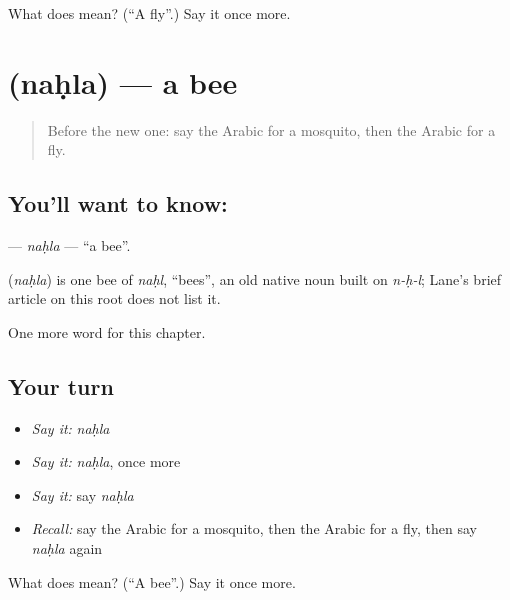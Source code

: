 \begin{tcolorbox}[breakable,colback=teal!4,colframe=teal!35!black,title={Before you move on}]
What does  mean? (\textquotedblleft{}A fly\textquotedblright{}.) Say it once more.
\end{tcolorbox}
\section[\texorpdfstring{\ar{نحلة} (naḥla)}{نحلة (naḥla)}]{ (naḥla) — a bee}

\label{lesson:AR-C136-nahla}



\begin{quote}
Before the new one: say the Arabic for a mosquito, then the Arabic for a fly.
\end{quote}

\subsection*{You'll want to know: }
\textbf{} — \emph{naḥla} — \textquotedblleft{}a bee\textquotedblright{}.

\begin{cousinweb}
\textbf{} (\emph{naḥla}) is one bee of \emph{naḥl}, \textquotedblleft{}bees\textquotedblright{}, an old native noun built on \emph{n-ḥ-l}; Lane's brief article on this root does not list it.
\end{cousinweb}

\begin{grammarlens}[title={What you've built}]
One more word for this chapter.
\end{grammarlens}

\subsection*{Your turn}
\begin{itemize}
\raggedright
  \item \emph{Say it:} \emph{naḥla}
  \item \emph{Say it:} \emph{naḥla}, once more
  \item \emph{Say it:} say \emph{naḥla}
  \item \emph{Recall:} say the Arabic for a mosquito, then the Arabic for a fly, then say \emph{naḥla} again
\end{itemize}

\begin{tcolorbox}[breakable,colback=teal!4,colframe=teal!35!black,title={Before you move on}]
What does  mean? (\textquotedblleft{}A bee\textquotedblright{}.) Say it once more.
\end{tcolorbox}
